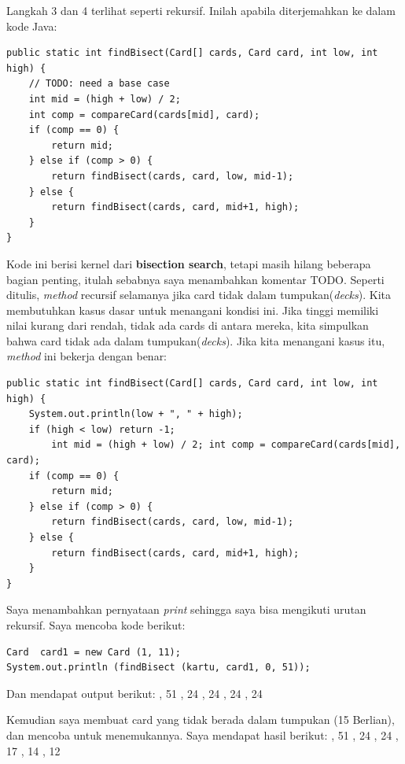 \documentclass[12pt,b5paper,openright,twoside]{book}
\begin{document}
\noindent Langkah 3 dan 4 terlihat seperti rekursif. 
Inilah apabila diterjemahkan ke dalam kode Java:

\begin{lstlisting}
public static int findBisect(Card[] cards, Card card, int low, int high) {
    // TODO: need a base case 
    int mid = (high + low) / 2; 
    int comp = compareCard(cards[mid], card);
    if (comp == 0) { 
        return mid; 
    } else if (comp > 0) { 
        return findBisect(cards, card, low, mid-1); 
    } else { 
        return findBisect(cards, card, mid+1, high); 
    }
}
\end{lstlisting}

\noindent Kode ini berisi kernel dari \textbf{bisection search}, tetapi masih hilang beberapa bagian penting, itulah sebabnya saya menambahkan komentar TODO. Seperti ditulis, \textit{method} recursif selamanya jika card tidak dalam tumpukan(\textit{decks}). Kita membutuhkan kasus dasar untuk menangani kondisi ini.
Jika tinggi memiliki nilai kurang dari rendah, tidak ada cards di antara mereka, kita simpulkan bahwa card tidak ada dalam tumpukan(\textit{decks}). Jika kita menangani kasus itu, \textit{method} ini bekerja dengan benar:
\begin{lstlisting}
public static int findBisect(Card[] cards, Card card, int low, int high) { 
    System.out.println(low + ", " + high);
    if (high < low) return -1;
        int mid = (high + low) / 2; int comp = compareCard(cards[mid], card);
    if (comp == 0) { 
        return mid;
    } else if (comp > 0) { 
        return findBisect(cards, card, low, mid-1); 
    } else { 
        return findBisect(cards, card, mid+1, high); 
    }
}
\end{lstlisting}

Saya menambahkan pernyataan \textit{print} sehingga saya bisa mengikuti urutan rekursif. Saya mencoba kode berikut: 
\begin{lstlisting}
Card  card1 = new Card (1, 11); 
System.out.println (findBisect (kartu, card1, 0, 51)); 
\end{lstlisting}

\noindent Dan mendapat output berikut: 
, 51 
, 24 
, 24 
, 24 
, 24 

\noindent Kemudian saya membuat card yang tidak berada dalam tumpukan (15 Berlian), dan mencoba untuk menemukannya. Saya mendapat hasil berikut: 
, 51 
, 24 
, 24 
, 17 
, 14 
, 12
\end{document}
